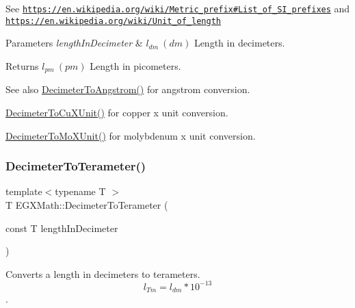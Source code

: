 See \href{https://en.wikipedia.org/wiki/Metric_prefix#List_of_SI_prefixes}{\tt https\+://en.\+wikipedia.\+org/wiki/\+Metric\+\_\+prefix\#\+List\+\_\+of\+\_\+\+S\+I\+\_\+prefixes} and \href{https://en.wikipedia.org/wiki/Unit_of_length}{\tt https\+://en.\+wikipedia.\+org/wiki/\+Unit\+\_\+of\+\_\+length} 
\begin{DoxyParams}{Parameters}
{\em length\+In\+Decimeter} & $ l_{dm}\ (dm)$ Length in decimeters. \\
\hline
\end{DoxyParams}
\begin{DoxyReturn}{Returns}
$ l_{pm}\ (pm)$ Length in picometers. 
\end{DoxyReturn}
\begin{DoxySeeAlso}{See also}
\mbox{\hyperlink{group___e_g_x_math-_conversions-_length_conversions-_s_i-_decimeter-_non-_s_i_gaffa5876e4f15bc859c369e8bfb9e4183}{Decimeter\+To\+Angstrom()}} for angstrom conversion. 

\mbox{\hyperlink{group___e_g_x_math-_conversions-_length_conversions-_s_i-_decimeter-_non-_s_i_gab595b2398e8e838922b4591308466e87}{Decimeter\+To\+Cu\+X\+Unit()}} for copper x unit conversion. 

\mbox{\hyperlink{group___e_g_x_math-_conversions-_length_conversions-_s_i-_decimeter-_non-_s_i_ga609f53e09c9a767639da3ad72905bb71}{Decimeter\+To\+Mo\+X\+Unit()}} for molybdenum x unit conversion. 
\end{DoxySeeAlso}
\mbox{\label{group___e_g_x_math-_conversions-_length_conversions-_s_i-_decimeter-_s_i_ga182e057812e247aa0058051c08e29bee}} 
\subsubsection{\texorpdfstring{Decimeter\+To\+Terameter()}{DecimeterToTerameter()}}
{\footnotesize\ttfamily template$<$typename T $>$ \\
T E\+G\+X\+Math\+::\+Decimeter\+To\+Terameter (\begin{DoxyParamCaption}\item[{const T}]{length\+In\+Decimeter }\end{DoxyParamCaption})}



Converts a length in decimeters to terameters. \[ l_{Tm}=l_{dm} * 10^{-13} \]. 

